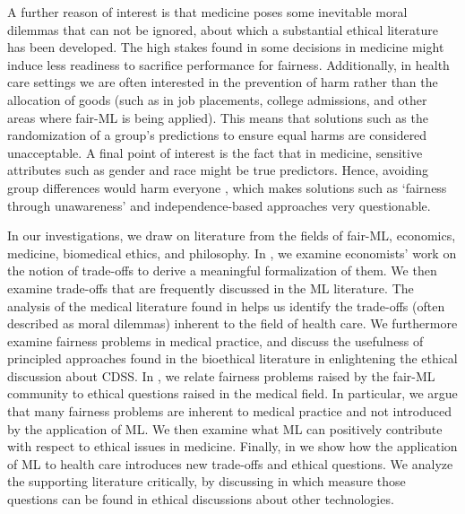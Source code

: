 A further reason of interest is that medicine poses some inevitable moral dilemmas that can not be ignored, about which a substantial ethical literature has been developed.
The high stakes found in some decisions in medicine might induce less readiness to sacrifice performance for fairness.
Additionally, in health care settings we are often interested in the prevention of harm rather than the allocation of goods (such as in job placements, college admissions, and other areas where fair-ML is being applied).
This means that solutions such as the randomization of a group's predictions to ensure equal harms are considered unacceptable.
A final point of interest is the fact that in medicine, sensitive attributes such as gender and race might be true predictors.
Hence, avoiding group differences would harm everyone \cite{Mccradden2020}, which makes solutions such as `fairness through unawareness' and independence-based approaches very questionable.

In our investigations, we draw on literature from the fields of fair-ML, economics, medicine, biomedical ethics, and philosophy.
In , we examine economists' work on the notion of trade-offs to derive a meaningful formalization of them.
We then examine trade-offs that are frequently discussed in the ML literature.
The analysis of the medical literature found in  helps us identify the trade-offs (often described as moral dilemmas) inherent to the field of health care.
We furthermore examine fairness problems in medical practice, and discuss the usefulness of principled approaches found in the bioethical literature in enlightening the ethical discussion about CDSS.
In , we relate fairness problems raised by the fair-ML community to ethical questions raised in the medical field.
In particular, we argue that many fairness problems are inherent to medical practice and not introduced by the application of ML.
We then examine what ML can positively contribute with respect to ethical issues in medicine.
Finally, in  we show how the application of ML to health care introduces new trade-offs and ethical questions.
We analyze the supporting literature critically, by discussing in which measure those questions can be found in ethical discussions about other technologies.
